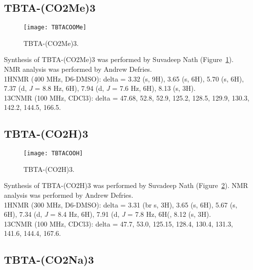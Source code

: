 \clearpage

\subsection{TBTA-(CO2Me)3}

\begin{figure}
\centering
\texttt{[image: TBTACOOMe]}
\caption{TBTA-(CO2Me)3.}
\label{fig:TBTACOOMe}
\end{figure}

Synthesis of TBTA-(CO2Me)3 was performed by Suvadeep Nath (Figure~\ref{fig:TBTACOOMe}). NMR analysis was performed by Andrew Defries. \\

\noindent
1HNMR (400 MHz, D6-DMSO): delta = 3.32 (s, 9H), 3.65 (s, 6H), 5.70 (s, 6H), 7.37 (d, {\it J} = 8.8 Hz, 6H), 7.94 (d, {\it J} = 7.6 Hz, 6H), 8.13 (s, 3H). \\

\noindent
13CNMR (100 MHz, CDCl3): delta = 47.68, 52.8, 52.9, 125.2, 128.5, 129.9, 130.3, 142.2, 144.5, 166.5. \\

\clearpage

\subsection{TBTA-(CO2H)3}

\begin{figure}
\centering
\texttt{[image: TBTACOOH]}
\caption{TBTA-(CO2H)3.}
\label{fig:TBTACOOH}
\end{figure}

Synthesis of TBTA-(CO2H)3 was performed by Suvadeep Nath (Figure~\ref{fig:TBTACOOH}). NMR analysis was performed by Andrew Defries. \\

\noindent
1HNMR (300 MHz, D6-DMSO): delta = 3.31 (br s, 3H), 3.65 (s, 6H), 5.67 (s, 6H), 7.34 (d, {\it J} = 8.4 Hz, 6H), 7.91 (d, {\it J} = 7.8 Hz, 6H(, 8.12 (s, 3H). \\

\noindent
13CNMR (100 MHz, CDCl3): delta = 47.7, 53.0, 125.15, 128.4, 130.4, 131.3, 141.6, 144.4, 167.6. \\

\clearpage

\subsection{TBTA-(CO2Na)3}

